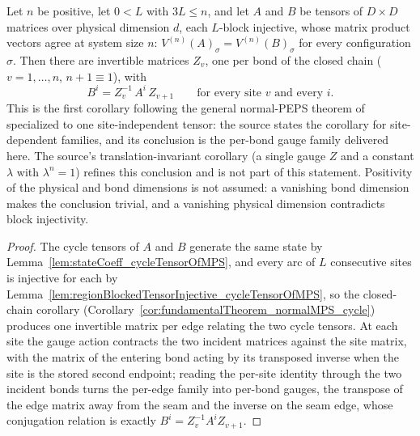 \begin{corollary}%
    \label{cor:fundamentalTheorem_normalMPS}
    \leanok
    Let $n$ be positive, let $0 < L$ with $3L \le n$, and let $A$ and $B$ be
    tensors of $D \times D$ matrices over physical dimension $d$, each
    $L$-block injective, whose matrix product vectors agree at system size
    $n$: $V^{(n)}(A)_\sigma = V^{(n)}(B)_\sigma$ for every configuration
    $\sigma$.  Then there are invertible matrices $Z_v$, one per bond of the
    closed chain ($v = 1, \ldots, n$, $n + 1 \equiv 1$), with
    \[
        B^i = Z_v^{-1}\, A^i\, Z_{v+1}
        \qquad\text{for every site } v \text{ and every } i .
    \]
    This is the first corollary following the general normal-PEPS theorem of
    \cite[Section~3]{Molnar2018NormalPEPS} specialized to one
    site-independent tensor: the source states the corollary for
    site-dependent families, and its conclusion is the per-bond gauge family
    delivered here.  The source's translation-invariant corollary (a single
    gauge $Z$ and a constant $\lambda$ with $\lambda^n = 1$) refines this
    conclusion and is not part of this statement.  Positivity of the
    physical and bond dimensions is not assumed: a vanishing bond dimension
    makes the conclusion trivial, and a vanishing physical dimension
    contradicts block injectivity.
\end{corollary}
\begin{proof}\leanok
    The cycle tensors of $A$ and $B$ generate the same state by
    Lemma~\ref{lem:stateCoeff_cycleTensorOfMPS}, and every arc of
    $L$ consecutive sites is injective for each by
    Lemma~\ref{lem:regionBlockedTensorInjective_cycleTensorOfMPS}, so the
    closed-chain corollary
    (Corollary~\ref{cor:fundamentalTheorem_normalMPS_cycle}) produces one
    invertible matrix per edge relating the two cycle tensors.  At each site
    the gauge action contracts the two incident matrices against the site
    matrix, with the matrix of the entering bond acting by its
    transposed inverse when the site is the stored second endpoint; reading
    the per-site identity through the two incident bonds turns the per-edge
    family into per-bond gauges, the transpose of the edge matrix away from
    the seam and the inverse on the seam edge, whose conjugation relation is
    exactly $B^i = Z_v^{-1} A^i Z_{v+1}$.
\end{proof}

